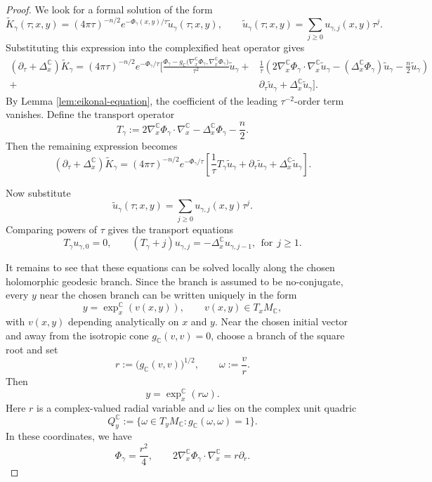 \documentclass[11pt]{amsart}
\theoremstyle{plain}
\theoremstyle{definition}
\newcommand{\C}{\mathbb{C}}
\begin{document}
\begin{proof}
We look for a formal solution of the form
\begin{equation*}
\widetilde K_\gamma(\tau;x,y)
=
(4\pi\tau)^{-n/2}
e^{-\Phi_\gamma(x,y)/\tau}
\widetilde u_\gamma(\tau;x,y),
\qquad
\widetilde u_\gamma(\tau;x,y)
=
\sum_{j\ge0}u_{\gamma,j}(x,y)\tau^j .
\end{equation*}
Substituting this expression into the complexified heat operator gives
\begin{align*}
(\partial_\tau+\Delta_x^{\C})\widetilde K_\gamma
=
(4\pi\tau)^{-n/2}
e^{-\Phi_\gamma/\tau}
\Bigg[
\frac{\Phi_\gamma-g_{\mathbb C}\bigl(\nabla_x^{\mathbb C}\Phi_\gamma,\nabla_x^{\mathbb C}\Phi_\gamma\bigr)}{\tau^2}\widetilde u_\gamma  
+&\frac1\tau\left(
2\nabla_x^{\C}\Phi_\gamma\cdot\nabla_x^{\C}\widetilde u_\gamma-(\Delta_x^{\C}\Phi_\gamma)\widetilde u_\gamma
-\frac n2\widetilde u_\gamma\right) \\
+&\partial_\tau\widetilde u_\gamma
+\Delta_x^{\C}\widetilde u_\gamma
\Bigg].
\end{align*}
By Lemma \ref{lem:eikonal-equation}, the coefficient of the leading $\tau^{-2}$-order term vanishes. Define the transport operator
\begin{equation*}
T_\gamma:=2\nabla_x^{\C}\Phi_\gamma\cdot\nabla_x^{\C}-
\Delta_x^{\C}\Phi_\gamma-\frac n2.
\end{equation*}
Then the remaining expression becomes
\begin{equation*}
(\partial_\tau+\Delta_x^{\C})\widetilde K_\gamma
=(4\pi\tau)^{-n/2}
e^{-\Phi_\gamma/\tau}
\left[\frac1\tau T_\gamma\widetilde u_\gamma
+\partial_\tau\widetilde u_\gamma
+\Delta_x^{\C}\widetilde u_\gamma\right].
\end{equation*}

Now substitute
\begin{equation*}
\widetilde u_\gamma(\tau;x,y)
=\sum_{j\ge0}u_{\gamma,j}(x,y)\tau^j .
\end{equation*}
Comparing powers of $\tau$ gives the transport equations
\begin{equation*}
T_\gamma u_{\gamma,0}=0,\qquad 
\left(T_\gamma+j\right)u_{\gamma,j}
=-\Delta_x^{\C}u_{\gamma,j-1},~~\text{for}~~j\ge1.
\end{equation*}

It remains to see that these equations can be solved locally along the chosen holomorphic geodesic branch. Since the branch is assumed to be no-conjugate, every
$y$ near the chosen branch can be written uniquely in the form
\[
y=\exp_x^{\C}(v(x,y)),\qquad v(x,y)\in T_xM_{\C},
\]
with $v(x,y)$ depending analytically on $x$ and $y$. Near the chosen initial vector and away from the isotropic
cone $g_{\C}(v,v)=0$, choose a branch of the square root and set
\[
r:=\bigl(g_{\C}(v,v)\bigr)^{1/2},\qquad
\omega:=\frac{v}{r}.
\]
Then
\[
y=\exp_x^{\C}(r\omega).
\]
Here $r$ is a complex-valued radial variable and $\omega$ lies on the complex unit quadric
\[
Q_y^{\C}:=
\{\omega\in T_yM_{\C}: g_{\C}(\omega,\omega)=1\}.
\]
In these coordinates, we have
\begin{equation*}
\Phi_\gamma=\frac{r^2}{4},\qquad
2\nabla_x^{\C}\Phi_\gamma\cdot\nabla_x^{\C}
=r\partial_r.
\end{equation*}


\end{proof}
\end{document}
